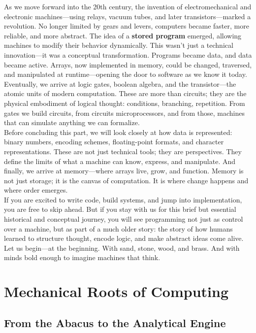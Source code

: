 \documentclass[12pt, oneside]{book}
\begin{document}
As we move forward into the 20th century, the invention of electromechanical and electronic machines—using relays, vacuum tubes, and later transistors—marked a revolution. No longer limited by gears and levers, computers became faster, more reliable, and more abstract. The idea of a \textbf{stored program} emerged, allowing machines to modify their behavior dynamically. This wasn’t just a technical innovation—it was a conceptual transformation. Programs became data, and data became active. Arrays, now implemented in memory, could be changed, traversed, and manipulated at runtime—opening the door to software as we know it today.\\
Eventually, we arrive at logic gates, boolean algebra, and the transistor—the atomic units of modern computation. These are more than circuits; they are the physical embodiment of logical thought: conditions, branching, repetition. From gates we build circuits, from circuits microprocessors, and from those, machines that can simulate anything we can formalize.\\
Before concluding this part, we will look closely at how data is represented: binary numbers, encoding schemes, floating-point formats, and character representations. These are not just technical tools; they are perspectives. They define the limits of what a machine can know, express, and manipulate. And finally, we arrive at memory—where arrays live, grow, and function. Memory is not just storage; it is the canvas of computation. It is where change happens and where order emerges.\\
If you are excited to write code, build systems, and jump into implementation, you are free to skip ahead. But if you stay with us for this brief but essential historical and conceptual journey, you will see programming not just as control over a machine, but as part of a much older story: the story of how humans learned to structure thought, encode logic, and make abstract ideas come alive.\\
Let us begin—at the beginning. With sand, stone, wood, and brass. And with minds bold enough to imagine machines that think.
	\chapter{Mechanical Roots of Computing}
	\section{From the Abacus to the Analytical Engine}
	
\end{document}
